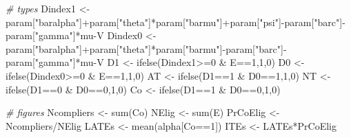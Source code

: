 \documentclass[
]{book}
\newenvironment{Shaded}{\begin{snugshade}}{\end{snugshade}}
\newcommand{\CommentTok}[1]{\textcolor[rgb]{0.56,0.35,0.01}{\textit{#1}}}
\newcommand{\DecValTok}[1]{\textcolor[rgb]{0.00,0.00,0.81}{#1}}
\newcommand{\FunctionTok}[1]{\textcolor[rgb]{0.00,0.00,0.00}{#1}}
\newcommand{\NormalTok}[1]{#1}
\newcommand{\OtherTok}[1]{\textcolor[rgb]{0.56,0.35,0.01}{#1}}
\newcommand{\SpecialCharTok}[1]{\textcolor[rgb]{0.00,0.00,0.00}{#1}}
\newcommand{\StringTok}[1]{\textcolor[rgb]{0.31,0.60,0.02}{#1}}
\theoremstyle{definition}
\theoremstyle{definition}
\theoremstyle{definition}
\theoremstyle{definition}
\theoremstyle{remark}
\begin{document}
\begin{Shaded}
\begin{Highlighting}[]
\CommentTok{\# types}
\NormalTok{Dindex1 }\OtherTok{\textless{}{-}}\NormalTok{ param[}\StringTok{"baralpha"}\NormalTok{]}\SpecialCharTok{+}\NormalTok{param[}\StringTok{"theta"}\NormalTok{]}\SpecialCharTok{*}\NormalTok{param[}\StringTok{"barmu"}\NormalTok{]}\SpecialCharTok{+}\NormalTok{param[}\StringTok{"psi"}\NormalTok{]}\SpecialCharTok{{-}}\NormalTok{param[}\StringTok{"barc"}\NormalTok{]}\SpecialCharTok{{-}}\NormalTok{param[}\StringTok{"gamma"}\NormalTok{]}\SpecialCharTok{*}\NormalTok{mu}\SpecialCharTok{{-}}\NormalTok{V}
\NormalTok{Dindex0 }\OtherTok{\textless{}{-}}\NormalTok{ param[}\StringTok{"baralpha"}\NormalTok{]}\SpecialCharTok{+}\NormalTok{param[}\StringTok{"theta"}\NormalTok{]}\SpecialCharTok{*}\NormalTok{param[}\StringTok{"barmu"}\NormalTok{]}\SpecialCharTok{{-}}\NormalTok{param[}\StringTok{"barc"}\NormalTok{]}\SpecialCharTok{{-}}\NormalTok{param[}\StringTok{"gamma"}\NormalTok{]}\SpecialCharTok{*}\NormalTok{mu}\SpecialCharTok{{-}}\NormalTok{V}
\NormalTok{D1 }\OtherTok{\textless{}{-}} \FunctionTok{ifelse}\NormalTok{(Dindex1}\SpecialCharTok{\textgreater{}=}\DecValTok{0} \SpecialCharTok{\&}\NormalTok{ E}\SpecialCharTok{==}\DecValTok{1}\NormalTok{,}\DecValTok{1}\NormalTok{,}\DecValTok{0}\NormalTok{)}
\NormalTok{D0 }\OtherTok{\textless{}{-}} \FunctionTok{ifelse}\NormalTok{(Dindex0}\SpecialCharTok{\textgreater{}=}\DecValTok{0} \SpecialCharTok{\&}\NormalTok{ E}\SpecialCharTok{==}\DecValTok{1}\NormalTok{,}\DecValTok{1}\NormalTok{,}\DecValTok{0}\NormalTok{)}
\NormalTok{AT }\OtherTok{\textless{}{-}} \FunctionTok{ifelse}\NormalTok{(D1}\SpecialCharTok{==}\DecValTok{1} \SpecialCharTok{\&}\NormalTok{ D0}\SpecialCharTok{==}\DecValTok{1}\NormalTok{,}\DecValTok{1}\NormalTok{,}\DecValTok{0}\NormalTok{)}
\NormalTok{NT }\OtherTok{\textless{}{-}} \FunctionTok{ifelse}\NormalTok{(D1}\SpecialCharTok{==}\DecValTok{0} \SpecialCharTok{\&}\NormalTok{ D0}\SpecialCharTok{==}\DecValTok{0}\NormalTok{,}\DecValTok{1}\NormalTok{,}\DecValTok{0}\NormalTok{)}
\NormalTok{Co }\OtherTok{\textless{}{-}} \FunctionTok{ifelse}\NormalTok{(D1}\SpecialCharTok{==}\DecValTok{1} \SpecialCharTok{\&}\NormalTok{ D0}\SpecialCharTok{==}\DecValTok{0}\NormalTok{,}\DecValTok{1}\NormalTok{,}\DecValTok{0}\NormalTok{)}

\CommentTok{\# figures}
\NormalTok{Ncompliers }\OtherTok{\textless{}{-}} \FunctionTok{sum}\NormalTok{(Co)}
\NormalTok{NElig }\OtherTok{\textless{}{-}} \FunctionTok{sum}\NormalTok{(E)}
\NormalTok{PrCoElig }\OtherTok{\textless{}{-}}\NormalTok{ Ncompliers}\SpecialCharTok{/}\NormalTok{NElig}
\NormalTok{LATEs }\OtherTok{\textless{}{-}} \FunctionTok{mean}\NormalTok{(alpha[Co}\SpecialCharTok{==}\DecValTok{1}\NormalTok{])}
\NormalTok{ITEs }\OtherTok{\textless{}{-}}\NormalTok{ LATEs}\SpecialCharTok{*}\NormalTok{PrCoElig}
\end{Highlighting}
\end{Shaded}
\end{document}
